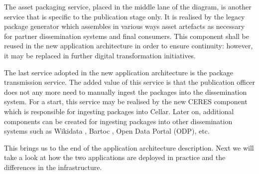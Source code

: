 	The asset packaging service, placed in the middle lane of the diagram, is another service that is specific to the publication stage only. It is realised by the legacy package generator which assembles in various ways asset artefacts as necessary for partner dissemination systems and final consumers. This component shall be reused in the new application architecture in order to ensure continuity: however, it may be replaced in further digital transformation initiatives. 
	
	The last service adopted in the new application architecture is the package transmission service. The added value of this service is that the publication officer does not any more need to manually ingest the packages into the dissemination system. For a start, this service may be realised by the new CERES component which is responsible for ingesting packages into Cellar. Later on, additional components can be created for ingesting packages into other dissemination systems such as Wikidata \citep{vrandevcic2014wikidata}, Bartoc \citep{ledl2016describing}, Open Data Portal (ODP), etc. 
	
	This brings us to the end of the application architecture description. Next we will take a look at how the two applications are deployed in practice and the differences in the infrastructure.